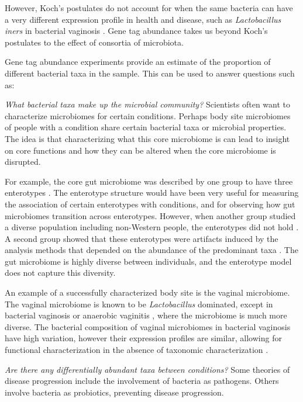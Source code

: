 However, Koch’s postulates do not account for when the same bacteria can have a very different expression profile in health and disease, such as \textit{Lactobacillus iners} in bacterial vaginosis \cite{macklaim2013comparative}. Gene tag abundance takes us beyond Koch's postulates to the effect of consortia of microbiota.

Gene tag abundance experiments provide an estimate of the proportion of different bacterial taxa in the sample. This can be used to answer questions such as:

\textit{What bacterial taxa make up the microbial community?}
Scientists often want to characterize microbiomes for certain conditions. Perhaps body site microbiomes of people with a condition share certain bacterial taxa or microbial properties. The idea is that characterizing what this core microbiome is can lead to insight on core functions and how they can be altered when the core microbiome is disrupted.

For example, the core gut microbiome was described by one group to have three enterotypes \cite{arumugam2011enterotypes}. The enterotype structure would have been very useful for measuring the association of certain enterotypes with conditions, and for observing how gut microbiomes transition across enterotypes. However, when another group studied a diverse population including non-Western people, the enterotypes did not hold \cite{yatsunenko2012human}. A second group showed that these enterotypes were artifacts induced by the analysis methods that depended on the abundance of the predominant taxa \cite{gorvitovskaia2016interpreting}. The gut microbiome is highly diverse between individuals, and the enterotype model does not capture this diversity.

An example of a successfully characterized body site is the vaginal microbiome. The vaginal microbiome is known to be \textit{Lactobacillus} dominated, except in bacterial vaginosis \cite{hummelen2010deep} or anaerobic vaginitis \cite{donders2002definition}, where the microbiome is much more diverse. The bacterial composition of vaginal microbiomes in bacterial vaginosis have high variation, however their expression profiles are similar, allowing for functional characterization in the absence of taxonomic characterization \cite{macklaim2013comparative}.

\textit{Are there any differentially abundant taxa between conditions?}
Some theories of disease progression include the involvement of bacteria as pathogens. Others involve bacteria as probiotics, preventing disease progression.

